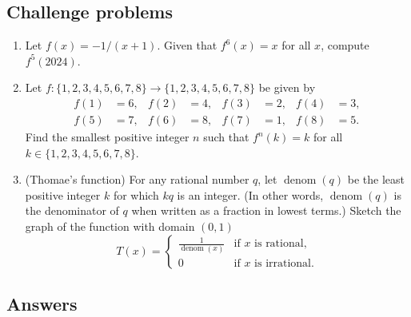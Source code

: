 \subsection{Challenge problems}

\begin{enumerate}[resume]
\item Let $f(x) = -1/(x + 1)$. Given that $f^6(x) = x$ for all $x$, compute $f^5(2024)$.
\item Let $f:\{1,2,3,4,5,6,7,8\}\to\{1,2,3,4,5,6,7,8\}$ be given by
\begin{align*}
f(1) &= 6, & f(2) &= 4, & f(3) &= 2, & f(4) &= 3, \\
f(5) &= 7, & f(6) &= 8, & f(7) &= 1, & f(8) &= 5.
\end{align*}
Find the smallest positive integer $n$ such that $f^n(k) = k$ for all $k\in\{1, 2, 3, 4, 5, 6, 7, 8\}$.
\item (Thomae's function) For any rational number $q$, let $\operatorname{denom}(q)$ be the least positive integer $k$ for which $kq$ is an integer. (In other words, $\operatorname{denom}(q)$ is the denominator of $q$ when written as a fraction in lowest terms.) Sketch the graph of the function with domain $(0,1)$
\begin{equation*}
T(x) = \begin{cases} \tfrac{1}{\operatorname{denom}(x)} & \text{if }x\text{ is rational}, \\ 0 & \text{if }x\text{ is irrational}. \end{cases}
\end{equation*}
\end{enumerate}


\newpage
\subsection{Answers}

